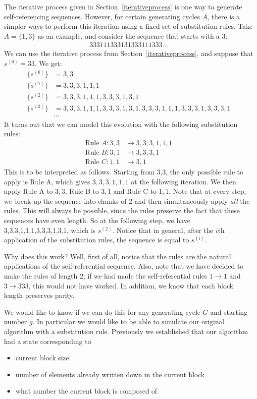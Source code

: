\documentclass[runningheads,a4paper]{llncs}
\begin{document}
The iterative process given in Section~\ref{iterativeprocess} is one way to generate self-referencing sequences. However, for certain generating cycles $A$, there is a simpler ways to perform this iteration using a fixed set of substitution rules. Take $A = \{1,3\}$ as an example, and consider the sequence that starts with a 3:
\begin{align*}
333111333131333111333\dots
\end{align*}
We can use the iterative process from Section~\ref{iterativeprocess}, and suppose that $s^{(0)} = 33$. We get:
\begin{align*}
\{s^{(0)}\} &= 3,3\\
\{s^{(1)}\} &= 3,3,3,1,1,1\\
\{s^{(2)}\} &= 3,3,3,1,1,1,3,3,3,1,3,1\\
\{s^{(3)}\} &= 3,3,3,1,1,1,3,3,3,1,3,1,3,3,3,1,1,1,3,3,3,1,3,3,3,1\\
&\cdots
\end{align*}
It turns out that we can model this evolution with the following substitution rules:
\begin{align*}
\text{Rule }A: 3,3 &\to 3,3,3,1,1,1 \\
\text{Rule }B: 3,1 &\to 3,3,3,1\\
\text{Rule }C: 1,1 &\to 3,1
\end{align*}
This is to be interpreted as follows. Starting from 3,3, the only possible rule to apply is Rule A, which gives $3,3,3,1,1,1$ at the following iteration. We then apply Rule A to $3,3$, Rule B to $3,1$ and Rule C to $1,1$. Note that at every step, we break up the sequence into chunks of 2 and then simultaneously apply \emph{all} the rules. This will always be possible, since the rules preserve the fact that these sequences have even length. So at the following step, we have 3,3,3,1,1,1,3,3,3,1,3,1, which is $s^{(2)}$. Notice that in general, after the $i$th application of the substitution rules, the sequence is equal to $s^{(i)}$.

Why does this work? Well, first of all, notice that the rules are the natural applications of the self-referential sequence. Also, note that we have decided to make the rules of length 2; if we had made the self-referential rules $1 \rightarrow 1$ and $3 \rightarrow 333$, this would not have worked. In addition, we know that each block length preserves parity. 

We would like to know if we can do this for any generating cycle $G$ and starting number $g$. In particular we would like to be able to simulate our original algorithm with a substitution rule. Previously we established that our algorithm had a state corresponding to 
\begin{itemize}
\item current block size
\item number of elements already written down in the current block
\item what number the current block is composed of 
\end{itemize}
\end{document}
